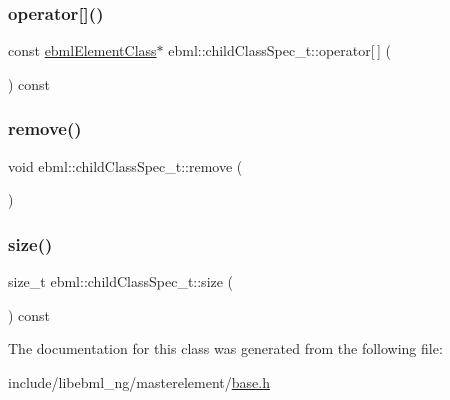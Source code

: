 \mbox{\label{classebml_1_1childClassSpec__t_abef70f82f195bd41dae3d08d956553c5}} 
\subsubsection{\texorpdfstring{operator[]()}{operator[]()}}
{\footnotesize\ttfamily const \mbox{\hyperlink{classebml_1_1ebmlElementClass}{ebml\+Element\+Class}}$\ast$ ebml\+::child\+Class\+Spec\+\_\+t\+::operator\mbox{[}$\,$\mbox{]} (\begin{DoxyParamCaption}\item[{\mbox{\hyperlink{namespaceebml_a86c5f604ddf12a74aa9812e997a58691}{ebml\+I\+D\+\_\+t}}}]{ }\end{DoxyParamCaption}) const}

\mbox{\label{classebml_1_1childClassSpec__t_a1eee1ea4974e2ad965e6020977349974}} 
\subsubsection{\texorpdfstring{remove()}{remove()}}
{\footnotesize\ttfamily void ebml\+::child\+Class\+Spec\+\_\+t\+::remove (\begin{DoxyParamCaption}\item[{\mbox{\hyperlink{namespaceebml_a86c5f604ddf12a74aa9812e997a58691}{ebml\+I\+D\+\_\+t}}}]{ }\end{DoxyParamCaption})}

\mbox{\label{classebml_1_1childClassSpec__t_a9432bd5e3ea363d4fb4ff4e1c0336f7b}} 
\subsubsection{\texorpdfstring{size()}{size()}}
{\footnotesize\ttfamily size\+\_\+t ebml\+::child\+Class\+Spec\+\_\+t\+::size (\begin{DoxyParamCaption}{ }\end{DoxyParamCaption}) const}



The documentation for this class was generated from the following file\+:\begin{DoxyCompactItemize}
\item 
include/libebml\+\_\+ng/masterelement/\mbox{\hyperlink{masterelement_2base_8h}{base.\+h}}\end{DoxyCompactItemize}
